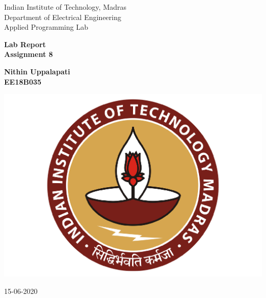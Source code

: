 \documentclass[10pt,english, openany]{book}
\begin{document}

\begin{titlepage}
	\clearpage\thispagestyle{empty}
	\centering
	\vspace{1cm}

	{\Large Indian Institute of Technology, Madras \\ 
		Department of Electrical Engineering \\
		Applied Programming Lab \par}
		\vspace{3cm}
	{\LARGE \textbf{Lab Report}} \\
    \LARGE \textbf{Assignment 8} \\
	\vspace{3cm}
	{\large \textbf{Nithin Uppalapati} \\ 
     \large \textbf{EE18B035} \\%
	\vspace{2cm}
    
    \centering \includegraphics[scale=0.2]{IITm.pdf}
%     
    \vspace{1.5cm}
		
	{\normalsize 15-06-2020 \par}
	
	\pagebreak
}
\end{titlepage}

\tableofcontents{}
\end{document}
